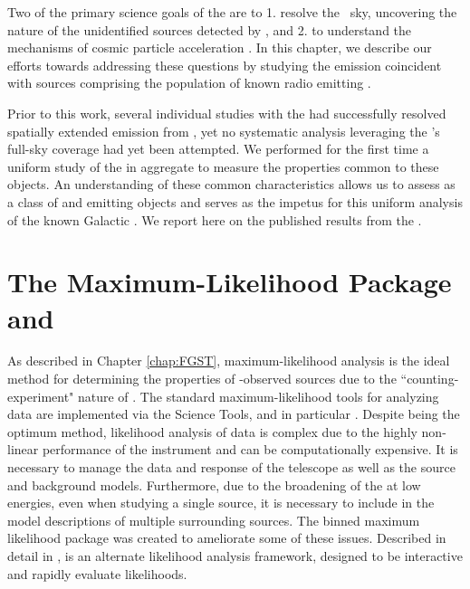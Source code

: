 {Two of the primary science goals of the \lat{}  are to 1. resolve the \gam~sky, uncovering the nature of the unidentified sources detected by \egret{}, and 2. to understand the mechanisms of cosmic particle acceleration \citep{atwood09}. In this chapter, we describe our efforts towards addressing these questions by studying the \gam{} emission coincident with sources comprising the population of known radio emitting \snrs{}.

Prior to this work, several individual studies with the \lat{} had successfully resolved spatially extended emission from \snrs{} \citep[and references therein]{3FGL}, yet no systematic analysis leveraging the \lat{}'s full-sky coverage had yet been attempted. We performed for the first time a uniform study of the \snrs{} in aggregate to measure the properties common to these objects. An understanding of these common characteristics allows us to assess \snrs{} as a class of \gam{} and \cray{} emitting objects and serves as the impetus for this uniform analysis of the known Galactic \snrs{}. We  report here on the published results from the \snrcat{} \cite{SNRcat}. 
 


\section{\label{snrCat:ptlk}The \ptlike{} Maximum-Likelihood Package and \srcs{}}

As described in Chapter \ref{chap:FGST}, maximum-likelihood analysis is the ideal method for determining the properties of \lat{}-observed sources due to the ``counting-experiment" nature of \FermiLat{}. The standard maximum-likelihood tools for analyzing \lat{} data are implemented via the \Fermi{} Science Tools, and in particular \gtlike{}.  Despite being the optimum method, likelihood analysis of \lat{} data is complex due to the highly non-linear performance of the instrument and can be computationally expensive. It is necessary to manage the data and response of the telescope as well as the source and background models. Furthermore, due to the broadening of the \psf{} at low energies, even when studying a single source, it is necessary to include in the model descriptions of multiple surrounding sources. The \ptlike{} binned maximum likelihood package was created to ameliorate some of these issues. Described in detail in \cite{Kerr10}, \ptlike{} is an alternate likelihood analysis framework, designed to be interactive and rapidly evaluate likelihoods.  

}
